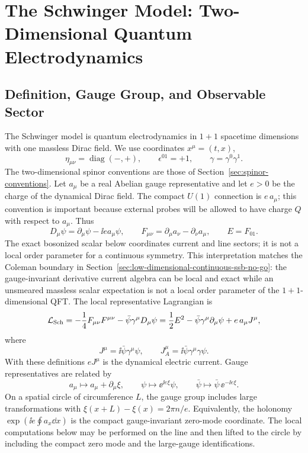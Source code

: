 \chapter{The Schwinger Model: Two-Dimensional Quantum Electrodynamics}
\label{ch:schwinger-model}
\ConventionsLorentzian

\section{Definition, Gauge Group, and Observable Sector}

The Schwinger model is quantum electrodynamics in \(1+1\) spacetime
dimensions with one massless Dirac field.  We use coordinates
\(x^\mu=(t,x)\),
\[
  \eta_{\mu\nu}=\operatorname{diag}(-,+),
  \qquad
  \epsilon^{01}=+1,
  \qquad
  \gamma=\gamma^0\gamma^1 .
\]
The two-dimensional spinor conventions are those of
Section~\ref{sec:spinor-conventions}.  Let \(a_\mu\) be a real Abelian
gauge representative and let \(e>0\) be the charge of the dynamical Dirac
field.  The compact \(U(1)\) connection is \(e\,a_\mu\); this convention is
important because external probes will be allowed to have charge \(Q\) with
respect to \(a_\mu\).  Thus
\[
  D_\mu\psi=\partial_\mu\psi-\ii e a_\mu\psi,
  \qquad
  F_{\mu\nu}=\partial_\mu a_\nu-\partial_\nu a_\mu,
  \qquad
  E=F_{01}.
\]
The exact bosonized scalar below coordinates current and line sectors; it is
not a local order parameter for a continuous symmetry.  This interpretation
matches the Coleman boundary in
Section~\ref{sec:low-dimensional-continuous-ssb-no-go}: the gauge-invariant
derivative current algebra can be local and exact while an unsmeared massless
scalar expectation is not a local order parameter of the \(1+1\)-dimensional
QFT.
The local representative Lagrangian is
\begin{equation}
  \mathcal L_{\rm Sch}
  =
  -\frac14F_{\mu\nu}F^{\mu\nu}
  -\bar\psi\gamma^\mu D_\mu\psi
  =
  \frac12E^2-\bar\psi\gamma^\mu\partial_\mu\psi
  +e\,a_\mu J^\mu ,
  \label{eq:schwinger-lagrangian}
\end{equation}
where
\begin{equation}
  J^\mu=\ii\bar\psi\gamma^\mu\psi,
  \qquad
  J_A^\mu=\ii\bar\psi\gamma^\mu\gamma\psi .
  \label{eq:schwinger-vector-axial-currents}
\end{equation}
With these definitions \(eJ^\mu\) is the dynamical electric current.  Gauge
representatives are related by
\[
  a_\mu\mapsto a_\mu+\partial_\mu\xi,
  \qquad
  \psi\mapsto \ee^{\ii e\xi}\psi,
  \qquad
  \bar\psi\mapsto\bar\psi\,\ee^{-\ii e\xi}.
\]
On a spatial circle of circumference \(L\), the gauge group includes large
transformations with \(\xi(x+L)-\xi(x)=2\pi n/e\).  Equivalently, the
holonomy \(\exp(\ii e\oint a_x\dd x)\) is the compact gauge-invariant
zero-mode coordinate.  The local computations below may be performed on the
line and then lifted to the circle by including the compact zero mode and
the large-gauge identifications.

